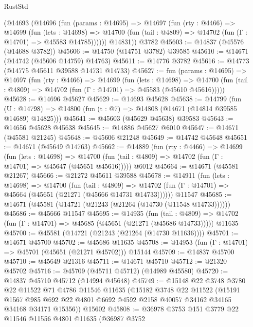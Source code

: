 \begin{lexlean}{RustStd}
\begin{coremodule}
      (@14693
        (@14696
          (fun (params : @14695) =>
          @14697
            (fun (rty : @4466) =>
            @14699
              (fun (lets : @14698) =>
              @14700 (fun (tail : @4809) => @14702 (fun (Γ : @14701) => @45583 @14785))))))
        @14831))
    @3782
@45603 := @14837 (@45576 (@14688 @3782))
@45606 := @14750 (@14751 @3782) @39585
@45610 := @14671 (@14742 (@45606 @14759) @14763)
@45611 := @14776 @3782
@45616 := @14773 (@14775 @45611 @39588 @14731 @14733)
@45627 := fun (params : @14695) =>
  @14697
    (fun (rty : @4466) =>
    @14699
      (fun (lets : @14698) =>
      @14700 (fun (tail : @4809) => @14702 (fun (Γ : @14701) => @45583 (@45610 @45616)))))
@45628 := @14696 @45627
@45629 := @14693 @45628
@45638 := @14799
    (fun (U : @14798) => @14800 (fun (t : @7) => @14808 (@14671 (@14814 @39585 @14689) @14825)))
@45641 := @45603 (@45629 @45638) @39583
@45643 := @14656 @45628 @45638
@45645 := @14886 @45627 @6010
@45647 := @14671 (@45581 @21245)
@45648 := @45606 @21248
@45649 := @14742 @45648
@45651 := @14671 (@45649 @14763)
@45662 := @14889
    (fun (rty : @4466) =>
    @14699
      (fun (lets : @14698) =>
      @14700 (fun (tail : @4809) => @14702 (fun (Γ : @14701) => @45647 (@45651 @45616)))))
    @6012
@45664 := @14671 (@45581 @21267)
@45666 := @21272 @45611 @39588
@45678 := @14911
    (fun (lets : @14698) =>
    @14700
      (fun (tail : @4809) =>
      @14702 (fun (Γ : @14701) => @45664 (@45651 (@21271 (@45666 @14731 @14733))))))
    @11547
@45685 := @14671 (@45581 (@14721 (@21243 (@21264 (@14730 (@11548 @14733))))))
@45686 := @45666 @11547
@45695 := @14935
    (fun (tail : @4809) => @14702 (fun (Γ : @14701) => @45685 (@45651 (@21271 (@45686 @14733)))))
    @11635
@45700 := @45581 (@14721 (@21243 (@21264 (@14730 @11636))))
@45701 := @14671 @45700
@45702 := @45686 @11635
@45708 := @14953 (fun (Γ : @14701) => @45701 (@45651 (@21271 @45702))) @15144
@45709 := @14837 @45700
@45710 := @45649 @21316
@45711 := @14671 @45710
@45712 := @21320 @45702
@45716 := @45709 (@45711 @45712) (@14989 @45580)
@45720 := @14837 @45710 @45712 (@14994 @45648)
@45749 := @15148
    @22
    @3748
    @3780
    @22
    @11522
    @71
    @4786
    @11546
    @11635
    (@15182
      @3748
      @22
      @11522
      (@15191
        @1567
        @985
        @692
        @22
        @4801
        @6692
        @4592
        @2158
        @40057
        @34162
        @34165
        @34168
        @34171
        @15356))
    @15602
@45808 := @36978
    @3753
    @151
    @3779
    @22
    @11546
    @11556
    @4801
    @11635
    (@36987
      @3752

\end{coremodule}
\end{lexlean}
